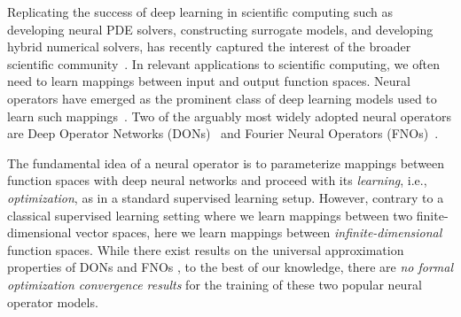 Replicating the success of deep learning in scientific computing such as developing neural PDE solvers, constructing surrogate models, and developing hybrid numerical solvers, has recently captured the interest of the broader scientific community~\citep{kutz2024promisdirectpde,kovachi2023neuraloperator}. In relevant applications to scientific computing, we often need to learn mappings between input and output function spaces. Neural operators have emerged as the prominent class of deep learning models used to learn such mappings~\citep{lu20201DeepONet}.
%
Two of the arguably most widely adopted neural operators are Deep Operator Networks (DONs)~\citep{lu20201DeepONet,wang_learning_2021} and {Fourier} Neural Operators (FNOs)~\citep{li_fourier_2021,li_markov_2021}. 

The fundamental idea of a neural operator is to parameterize mappings between function spaces with deep neural networks and proceed with its \emph{learning}, i.e., \emph{optimization}, as in a standard supervised learning setup. However, contrary to a classical supervised learning setting where we learn mappings between two finite-dimensional vector spaces, here we learn mappings between
\emph{infinite-dimensional} function spaces.
%
%
While there exist results on the universal approximation properties of DONs and FNOs \citep{deng2021convergence,kovachki2021universal}, to the best of our knowledge, 
there are \emph{no formal optimization convergence results} for the training of these two popular neural operator models. 
% 

